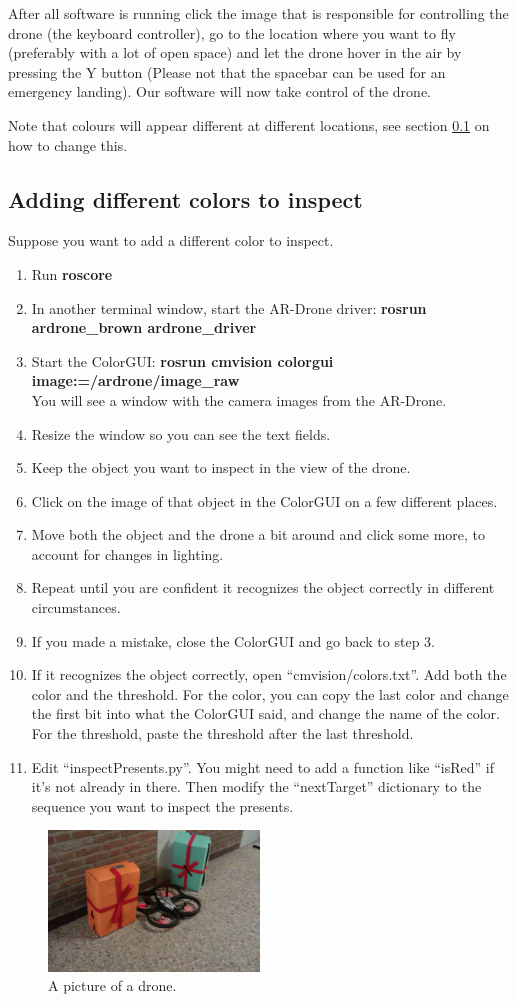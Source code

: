 \documentclass[a4paper,10pt]{article}
\begin{document}
After all software is running click the image that is responsible for controlling the drone (the keyboard controller), go to the location where you want to fly (preferably with a lot of open space) and let the drone hover in the air by pressing the Y button (Please not that the spacebar can be used for an emergency landing).
Our software will now take control of the drone. 

Note that colours will appear different at different locations, see section \ref{sec:changecolour} on how to change this. 

\subsection{Adding different colors to inspect}
\label{sec:changecolour}
Suppose you want to add a different color to inspect.
\begin{enumerate}
\item Run \textbf{roscore}
\item In another terminal window, start the AR-Drone driver: \textbf{rosrun ardrone\_brown ardrone\_driver}
\item Start the ColorGUI: \textbf{rosrun cmvision colorgui image:=/ardrone/image\_raw} \\
      You will see a window with the camera images from the AR-Drone.
\item Resize the window so you can see the text fields.
\item Keep the object you want to inspect in the view of the drone.
\item Click on the image of that object in the ColorGUI on a few different places.
\item Move both the object and the drone a bit around and click some more, to account for changes in lighting.
\item Repeat until you are confident it recognizes the object correctly in different circumstances.
\item If you made a mistake, close the ColorGUI and go back to step 3.
\item If it recognizes the object correctly, open ``cmvision/colors.txt''. Add both the color and the threshold. For the color, you can copy the last color and change the first bit into what the ColorGUI said, and change the name of the color. For the threshold, paste the threshold after the last threshold.
\item Edit ``inspectPresents.py''. You might need to add a function like ``isRed'' if it's not already in there. Then modify the ``nextTarget'' dictionary to the sequence you want to inspect the presents.
\end{enumerate}

\begin{figure}[h!]
	\caption{A picture of a drone.}
	\centering
	\includegraphics[width=0.5\textwidth]{images/presentsAndDrone}
\end{figure}
\end{document}
